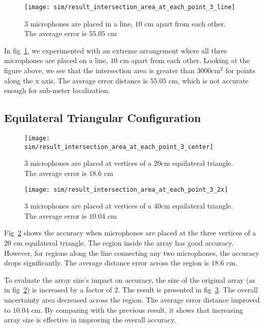 \begin{figure}[h!]
  \texttt{[image: sim/result\_intersection\_area\_at\_each\_point\_3\_line]}
  \caption{$3$ microphones are placed in a line, $10$ cm apart from each other. The average error is $55.05$ cm}
  \label{fig:sim_hm_3_line}
\end{figure}


In fig~\ref{fig:sim_hm_3_line}, we experimented with an extreme arrangement where all three microphones are placed on a line, $10$ cm apart from each other. Looking at the figure above, we see that the intersection area is greater than $3000 \mathrm{cm}^2$ for points along the x axis. The average error distance is $55.05$ cm, which is not accurate enough for sub-meter localization. 

\subsection{Equilateral Triangular Configuration}

\begin{figure*}[h!]
\centering
  \begin{subfigure}[]{.48\textwidth}
    \texttt{[image: sim/result\_intersection\_area\_at\_each\_point\_3\_center]}
    \caption{$3$ microphones are placed at vertices of a $20$cm equilateral triangle. The average error is $18.6$ cm}
    \label{fig:sim_hm_3}
  \end{subfigure}
  \begin{subfigure}[]{.48\textwidth}
    \texttt{[image: sim/result\_intersection\_area\_at\_each\_point\_3\_2x]}
    \caption{$3$ microphones are placed at vertices of a $40$cm equilateral triangle. The average error is $10.04$ cm}
    \label{fig:sim_hm_3_2x}
  \end{subfigure}
\end{figure*}

Fig~\ref{fig:sim_hm_3} shows the accuracy when microphones are placed at the three vertices of a $20$ cm equilateral triangle. The region inside the array has good accuracy. However, for regions along the line connecting any two microphones, the accuracy drops significantly. The average distance error across the region is $18.6$ cm.

To evaluate the array size's impact on accuracy, the size of the original array (as in fig~\ref{fig:sim_hm_3}) is increased by a factor of $2$. The result is presented in fig~\ref{fig:sim_hm_3_2x}. The overall uncertainty area decreased across the region. The average error distance improved to $10.04$ cm. By comparing with the previous result, it shows that increasing array size is effective in improving the overall accuracy. 

